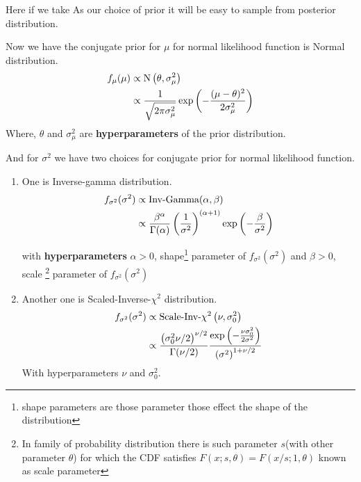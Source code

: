 \begin{example}
     Here if we take  As our choice of prior it will be easy to sample from posterior distribution.

     Now we have the conjugate prior for $ \mu $ for normal likelihood function is Normal distribution.
     \begin{align*}
         f_{\mu} (\mu) &\propto \text{N}\left( \theta,\sigma_{\mu}^{2}  \right) \\
                       &\propto \frac{ 1 }{ \sqrt{2 \pi \sigma_{\mu} ^{2} } } \exp \left( - \frac{ (\mu - \theta)^{2} }{ 2 \sigma_{\mu} ^{2}  } \right)
     \end{align*}
     Where, $ \theta $ and $ \sigma_{\mu}^{2} $ are \textbf{hyperparameters} of the prior distribution. 

     And for $ \sigma^2 $ we have two choices for conjugate prior for normal likelihood function.
     \begin{enumerate}
         \item One is Inverse-gamma distribution.
             \begin{align*}
                 f_{\sigma^2}(\sigma ^{2}) &\propto \text{Inv-Gamma}(\alpha,\beta) \\
                              &\propto \frac{ \beta^{\alpha}  }{ \Gamma(\alpha) } \left( \frac{ 1 }{ \sigma^2 } \right)^{(\alpha+1)} \exp \left( - \frac{ \beta }{ \sigma ^{2}  } \right)
             \end{align*}

             with \textbf{hyperparameters} $ \alpha > 0 $, shape\footnote{shape parameters are those parameter those effect the shape of the distribution} parameter of $ f_{\sigma ^{2}}(\sigma ^{2})  $ and $ \beta > 0 $, scale \footnote{ In family of probability distribution there is such parameter $ s $(with other parameter $ \theta $) for which the CDF satisfies $F(x;s,\theta) = F(x/s;1,\theta)$ known as scale parameter} parameter of $ f_{\sigma ^{2}}(\sigma ^{2})  $

        \item Another one is Scaled-Inverse-$\chi ^{2}$ distribution.
            \begin{align*}
                f_{\sigma ^{2} }(\sigma ^{2}) &\propto \text{Scale-Inv-}\chi^2\left( \nu,\sigma ^{2}_0 \right)\\ 
                                              &\propto \frac{ \left( \sigma_{0}^{2}\nu/2 \right)^{\nu/2}   }{ \Gamma(\nu/2) } \frac{ \exp\left( - \frac{ \nu \sigma_0 ^{2} }{ 2 \sigma ^{2} } \right) }{ \left( \sigma^2 \right)^{1+\nu/2}  }
            \end{align*}
            With hyperparameters $ \nu $ and $ \sigma_0 ^{2} $.
     \end{enumerate}


\end{example}
